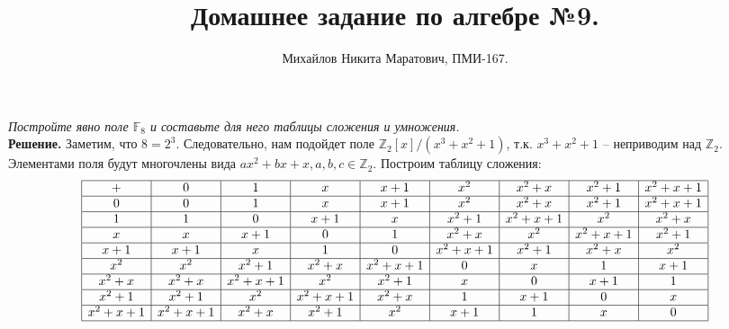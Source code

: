 \documentclass[a4paper, 10pt]{article}
\title{
	Домашнее задание по алгебре №9.
}
\author{Михайлов Никита Маратович, ПМИ-167.
}
\date{}
\newcommand{\Z}{\mathbb{Z}}
\newcommand{\F}{\mathbb{F}}
\begin{document}
\maketitle
\begin{spacing}{1}
		
\begin{center}
\end{center}
		
\noindent \textit{Постройте явно поле $\F_8$ и составьте для него таблицы сложения и умножения.
}\\
\noindent \textbf{Решение.} Заметим, что $8=2^3$. Следовательно, нам подойдет поле $\Z_2[x]/(x^3+x^2+1)$, т.к. $x^3+x^2+1$ -- неприводим над $\Z_2$. Элементами поля будут многочлены вида $ax^2+bx+x, a,b,c\in\Z_2$. Построим таблицу сложения:
$$
\begin{array}{|c|c|c|c|c|c|c|c|c|}
\hline
+			& 0 & 1 & x & x + 1 & x^2 & x^2 + x & x^2 + 1 &  x^2 + x + 1\\
\hline
0			& 0 & 1 & x & x + 1 & x^2 & x^2 + x & x^2 + 1 &  x^2 + x + 1\\
\hline
1			& 1 & 0 & x + 1 & x & x^2 + 1 & x^2 + x + 1 & x^2 &  x^2 + x\\
\hline
x			& x & x + 1 & 0 & 1 & x^2 + x & x^2 & x^2 + x + 1 &  x^2 + 1\\
\hline
x + 1		& x + 1 & x & 1 & 0 & x^2 + x + 1 & x^2 + 1 & x^2 + x &  x^2\\
\hline
x^2			& x^2 & x^2 + 1 & x^2 + x & x^2 + x + 1 & 0 & x & 1 & x + 1\\
\hline
x^2 + x		& x^2 + x & x^2 + x + 1 & x^2 & x^2 + 1 & x & 0 & x + 1 & 1\\
\hline
x^2 + 1		& x^2 + 1 & x^2 & x^2 + x + 1 & x^2 + x & 1 & x + 1 & 0 & x\\
\hline
x^2 + x + 1	& x^2 + x + 1 & x^2 + x & x^2 + 1 & x^2 & x + 1 & 1 & x & 0\\
\hline
\end{array}
$$


\end{spacing}
\end{document}
